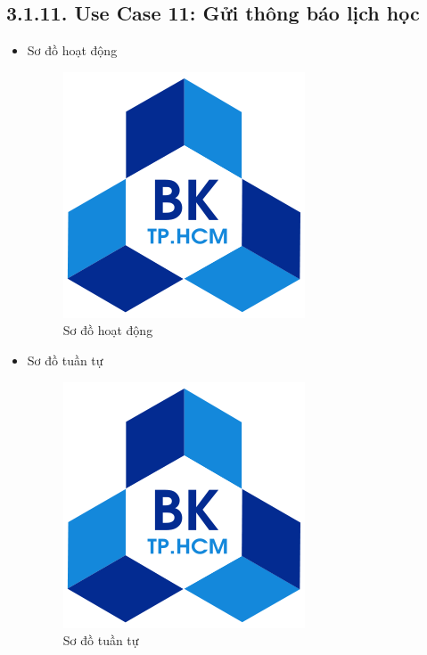 \subsection*{3.1.11. Use Case 11: Gửi thông báo lịch học}
\begin{itemize}
    \item Sơ đồ hoạt động
    \begin{figure}[H]
    \centering
    \includegraphics[scale=0.5 ]{Picture/hcmut.png}
    \caption{Sơ đồ hoạt động }
    \end{figure}
    \item Sơ đồ tuần tự
    \begin{figure}[H]
    \centering
    \includegraphics[scale=0.5 ]{Picture/hcmut.png}
    \caption{Sơ đồ tuần tự }
    \end{figure}
\end{itemize}
